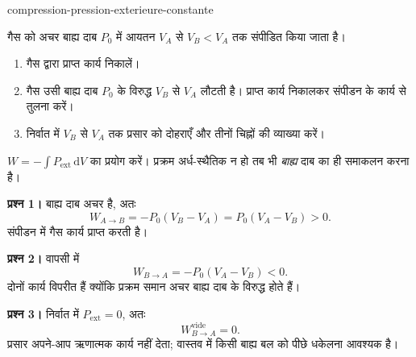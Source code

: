 \begin{exo}[अचर बाह्य दाब में संपीडन]{compression-pression-exterieure-constante}

गैस को अचर बाह्य दाब $P_0$ में आयतन $V_A$ से $V_B<V_A$ तक संपीडित किया जाता है।

\begin{enumerate}
\item गैस द्वारा प्राप्त कार्य निकालें।
\item गैस उसी बाह्य दाब $P_0$ के विरुद्ध $V_B$ से $V_A$ लौटती है। प्राप्त कार्य निकालकर संपीडन के कार्य से तुलना करें।
\item निर्वात में $V_B$ से $V_A$ तक प्रसार को दोहराएँ और तीनों चिह्नों की व्याख्या करें।
\end{enumerate}

\begin{indication}
$W=-\int P_{\mathrm{ext}}\,\mathrm{d}V$ का प्रयोग करें। प्रक्रम अर्ध-स्थैतिक न हो तब भी \emph{बाह्य} दाब का ही समाकलन करना है।
\end{indication}

\begin{solution}
\textbf{प्रश्न 1।} बाह्य दाब अचर है, अतः
\[
W_{A\to B}=-P_0(V_B-V_A)=P_0(V_A-V_B)>0.
\]
संपीडन में गैस कार्य प्राप्त करती है।

\textbf{प्रश्न 2।} वापसी में
\[
W_{B\to A}=-P_0(V_A-V_B)<0.
\]
दोनों कार्य विपरीत हैं क्योंकि प्रक्रम समान अचर बाह्य दाब के विरुद्ध होते हैं।

\textbf{प्रश्न 3।} निर्वात में $P_{\mathrm{ext}}=0$, अतः
\[
W_{B\to A}^{\mathrm{vide}}=0.
\]
प्रसार अपने-आप ऋणात्मक कार्य नहीं देता; वास्तव में किसी बाह्य बल को पीछे धकेलना आवश्यक है।
\end{solution}
\end{exo}
